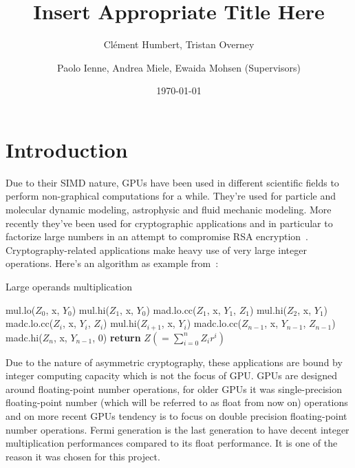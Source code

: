 \documentclass{report}
\begin{document}
\title{Insert Appropriate Title Here}
\author{Cl\'{e}ment Humbert, Tristan Overney\and Paolo Ienne, Andrea Miele, Ewaida Mohsen (Supervisors)}
\date{\today}
\maketitle

\nocite{*}

\setcounter{tocdepth}{1}
\tableofcontents
\listoffigures

\chapter{Introduction}

    Due to their SIMD nature, GPUs have been used in different scientific fields to perform
    non-graphical computations for a while. They're used for particle and molecular dynamic 
    modeling, astrophysic and fluid mechanic modeling.
    More recently they've been used for cryptographic applications and in particular
    to factorize large numbers in an attempt to compromise RSA encryption~\cite{cofact14}.
    Cryptography-related applications make heavy use of very large integer operations.
    Here's an algorithm as example from~\cite{cofact14}:
    \begin{algorithm}
    \caption{Large operands multiplication}\label{alg:mulalgo}
    \begin{algorithmic}[1]
        \State mul.lo($Z_0$, x, $Y_0$)
        \State mul.hi($Z_1$, x, $Y_0$)
        \State mad.lo.cc($Z_1$, x, $Y_1$, $Z_1$)
        \State mul.hi($Z_2$, x, $Y_1$)
            \State madc.lo.cc($Z_i$, x, $Y_i$, $Z_i$)
            \State mul.hi($Z_{i+1}$, x, $Y_i$)
        \EndFor
        \State madc.lo.cc($Z_{n-1}$, x, $Y_{n-1}$, $Z_{n-1}$)
        \State madc.hi($Z_n$, x, $Y_{n-1}$, 0)
        \State \textbf{return} $Z (=\sum_{i=0}^nZ_ir^i)$
    \end{algorithmic}
    \end{algorithm}

    Due to the nature of asymmetric cryptography, these applications are bound by
    integer computing capacity which is not the focus of GPU. GPUs are designed
    around floating-point number operations, for older GPUs it was single-precision
    floating-point number (which will be referred to as float from now on) operations and
    on more recent GPUs tendency is to focus on double precision floating-point number operations.
    Fermi generation is the last generation to have decent integer multiplication performances
    compared to its float performance. It is one of the reason it was chosen for this project.
\end{document}
